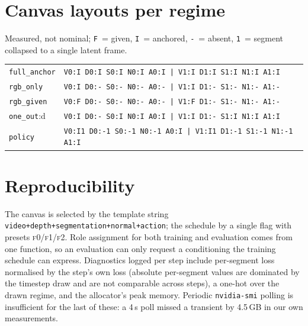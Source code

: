 \documentclass{article}
\begin{document}



\appendix
\section{Canvas layouts per regime}
Measured, not nominal; \texttt{F}~= given, \texttt{I}~= anchored, \texttt{-}~= absent,
\texttt{1}~= segment collapsed to a single latent frame.
\begin{center}
\small
\begin{tabular}{ll}
\toprule
\texttt{full\_anchor} & \texttt{V0:I D0:I S0:I N0:I A0:I | V1:I D1:I S1:I N1:I A1:I} \\
\texttt{rgb\_only}    & \texttt{V0:I D0:- S0:- N0:- A0:- | V1:I D1:- S1:- N1:- A1:-} \\
\texttt{rgb\_given}   & \texttt{V0:F D0:- S0:- N0:- A0:- | V1:F D1:- S1:- N1:- A1:-} \\
\texttt{one\_out}:d   & \texttt{V0:I D0:- S0:I N0:I A0:I | V1:I D1:- S1:I N1:I A1:I} \\
\texttt{policy}       & \texttt{V0:I1 D0:-1 S0:-1 N0:-1 A0:I | V1:I1 D1:-1 S1:-1 N1:-1 A1:I} \\
\bottomrule
\end{tabular}
\end{center}

\section{Reproducibility}
The canvas is selected by the template string
\texttt{video+depth+segmentation+normal+action}; the schedule by a single flag with presets
\textsc{f0}/\textsc{f1}/\textsc{f2}. Role assignment for both training and evaluation comes from
one function, so an evaluation can only request a conditioning the training schedule can express.
Diagnostics logged per step include per-segment loss normalised by the step's own loss (absolute
per-segment values are dominated by the timestep draw and are not comparable across steps), a
one-hot over the drawn regime, and the allocator's peak memory. Periodic \texttt{nvidia-smi}
polling is insufficient for the last of these: a 4\,s poll missed a transient by 4.5\,GB in our
own measurements.
\end{document}
